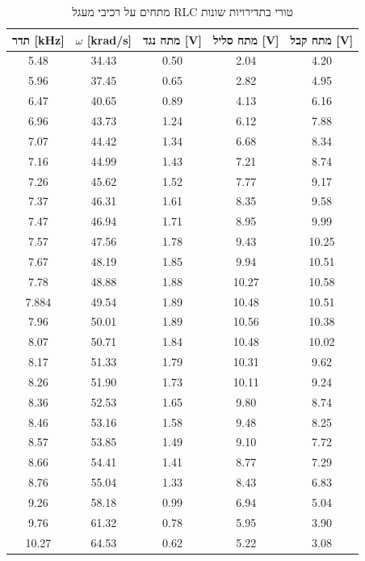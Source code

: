 \documentclass[14pt]{extarticle}
\begin{document}
\begin{table}[H]
    \centering
    \begin{tabular}{|c|c|c|c|c|}
        \hline
        תדר [kHz] & $\omega$ [krad/s] & מתח נגד [V] & מתח סליל [V] & מתח קבל [V] \\
        \hline
        5.48  & 34.43 & 0.50 & 2.04  & 4.20  \\
        5.96  & 37.45 & 0.65 & 2.82  & 4.95  \\
        6.47  & 40.65 & 0.89 & 4.13  & 6.16  \\
        6.96  & 43.73 & 1.24 & 6.12  & 7.88  \\
        7.07  & 44.42 & 1.34 & 6.68  & 8.34  \\
        7.16  & 44.99 & 1.43 & 7.21  & 8.74  \\
        7.26  & 45.62 & 1.52 & 7.77  & 9.17  \\
        7.37  & 46.31 & 1.61 & 8.35  & 9.58  \\
        7.47  & 46.94 & 1.71 & 8.95  & 9.99  \\
        7.57  & 47.56 & 1.78 & 9.43  & 10.25 \\
        7.67  & 48.19 & 1.85 & 9.94  & 10.51 \\
        7.78  & 48.88 & 1.88 & 10.27 & 10.58 \\
        7.884 & 49.54 & 1.89 & 10.48 & 10.51 \\
        7.96  & 50.01 & 1.89 & 10.56 & 10.38 \\
        8.07  & 50.71 & 1.84 & 10.48 & 10.02 \\
        8.17  & 51.33 & 1.79 & 10.31 & 9.62  \\
        8.26  & 51.90 & 1.73 & 10.11 & 9.24  \\
        8.36  & 52.53 & 1.65 & 9.80  & 8.74  \\
        8.46  & 53.16 & 1.58 & 9.48  & 8.25  \\
        8.57  & 53.85 & 1.49 & 9.10  & 7.72  \\
        8.66  & 54.41 & 1.41 & 8.77  & 7.29  \\
        8.76  & 55.04 & 1.33 & 8.43  & 6.83  \\
        9.26  & 58.18 & 0.99 & 6.94  & 5.04  \\
        9.76  & 61.32 & 0.78 & 5.95  & 3.90  \\
        10.27 & 64.53 & 0.62 & 5.22  & 3.08  \\
        \hline
    \end{tabular}
    \caption{מתחים על רכיבי מעגל RLC טורי בתדירויות שונות}
\end{table}
\end{document}
